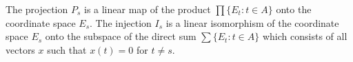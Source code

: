 The projection $P_s$ is a linear map of the product $\prod \{E_t : t \in A\}$ onto the coordinate space $E_s$. The injection $I_s$ is a linear isomorphism of the coordinate space $E_s$ onto the subspace of the direct sum $\sum \{E_t : t \in A\}$ which consists of all vectors $x$ such that $x(t) = 0$ for $t \neq s$.
